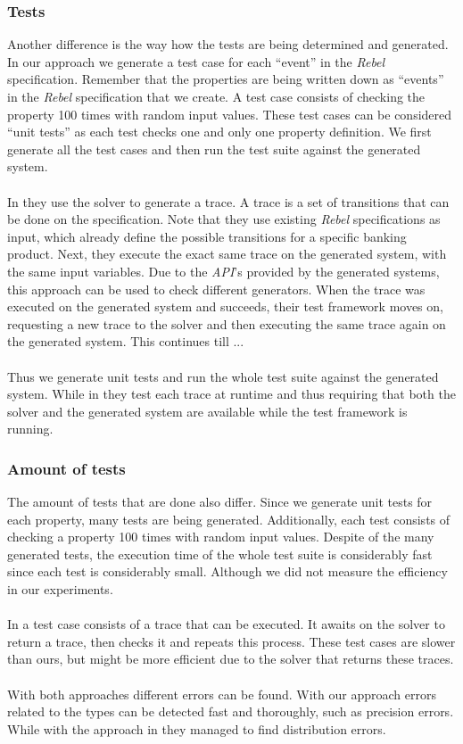 \subsubsection{Tests}
Another difference is the way how the tests are being determined and generated. In our approach we generate a test case for each ``event'' in the \textit{Rebel} specification. Remember that the properties are being written down as ``events'' in the \textit{Rebel} specification that we create. A test case consists of checking the property 100 times with random input values. These test cases can be considered ``unit tests'' as each test checks one and only one property definition. We first generate all the test cases and then run the test suite against the generated system.\\
\\
In  they use the solver to generate a trace. A trace is a set of transitions that can be done on the specification. Note that they use existing \textit{Rebel} specifications as input, which already define the possible transitions for a specific banking product. Next, they execute the exact same trace on the generated system, with the same input variables. Due to the \textit{API}'s provided by the generated systems, this approach can be used to check different generators. When the trace was executed on the generated system and succeeds, their test framework moves on, requesting a new trace to the solver and then executing the same trace again on the generated system. This continues till ...\\
\\
Thus we generate unit tests and run the whole test suite against the generated system. While in  they test each trace at runtime and thus requiring that both the solver and the generated system are available while the test framework is running.

\subsubsection{Amount of tests}
The amount of tests that are done also differ. Since we generate unit tests for each property, many tests are being generated. Additionally, each test consists of checking a property 100 times with random input values. Despite of the many generated tests, the execution time of the whole test suite is considerably fast since each test is considerably small. Although we did not measure the efficiency in our experiments.\\
\\
In  a test case consists of a trace that can be executed. It awaits on the solver to return a trace, then checks it and repeats this process. These test cases are slower than ours, but might be more efficient due to the solver that returns these traces.\\
\\
With both approaches different errors can be found. With our approach errors related to the types can be detected fast and thoroughly, such as precision errors. While with the approach in  they managed to find distribution errors. 
